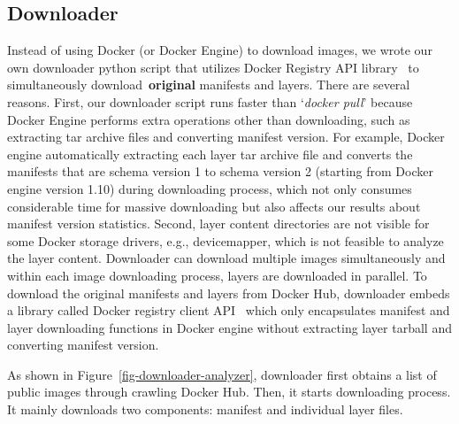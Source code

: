 \subsection{Downloader}

Instead of using Docker (or Docker Engine) to download images, we wrote our own downloader python script that utilizes Docker Registry API library~\cite{XXX} to simultaneously download~\textbf{original} manifests and layers.
%
%
%
There are several reasons.
%
First, our downloader script runs faster than `\textit{docker pull}' because Docker Engine performs extra operations other than downloading, such as extracting tar archive files and converting manifest version. 
%
For example, Docker engine automatically extracting each layer tar archive file and converts the manifests that are schema version 1 to schema version 2 (starting from Docker engine version 1.10) during downloading process, which not only consumes considerable time for massive downloading but also affects our results about manifest version statistics.
%
Second, layer content directories are not visible for some Docker storage drivers, e.g., devicemapper, which is not feasible to analyze the layer content. 
%
%
Downloader can download multiple images simultaneously and within each image downloading process, layers are downloaded in parallel.
%
To download the original manifests and layers from Docker Hub, downloader embeds a library called Docker registry client API~\cite{xxx} which only encapsulates manifest and layer downloading functions in Docker engine without extracting layer tarball and converting manifest version. 
%
%




%
As shown in Figure~\ref{fig-downloader-analyzer}, downloader first obtains a list of public images through crawling Docker Hub.
%
Then, it starts downloading process.
%
It mainly downloads two components: manifest and individual layer files. 



